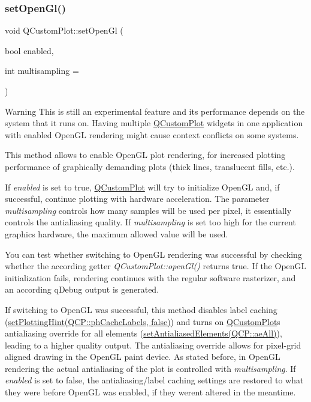 \subsubsection{\texorpdfstring{set\+Open\+Gl()}{setOpenGl()}}
{\footnotesize\ttfamily void Q\+Custom\+Plot\+::set\+Open\+Gl (\begin{DoxyParamCaption}\item[{bool}]{enabled,  }\item[{int}]{multisampling = {} }\end{DoxyParamCaption})}

\begin{DoxyWarning}{Warning}
This is still an experimental feature and its performance depends on the system that it runs on. Having multiple \hyperlink{classQCustomPlot}{Q\+Custom\+Plot} widgets in one application with enabled Open\+GL rendering might cause context conflicts on some systems.
\end{DoxyWarning}
This method allows to enable Open\+GL plot rendering, for increased plotting performance of graphically demanding plots (thick lines, translucent fills, etc.).

If {\itshape enabled} is set to true, \hyperlink{classQCustomPlot}{Q\+Custom\+Plot} will try to initialize Open\+GL and, if successful, continue plotting with hardware acceleration. The parameter {\itshape multisampling} controls how many samples will be used per pixel, it essentially controls the antialiasing quality. If {\itshape multisampling} is set too high for the current graphics hardware, the maximum allowed value will be used.

You can test whether switching to Open\+GL rendering was successful by checking whether the according getter {\itshape Q\+Custom\+Plot\+::open\+Gl()} returns true. If the Open\+GL initialization fails, rendering continues with the regular software rasterizer, and an according q\+Debug output is generated.

If switching to Open\+GL was successful, this method disables label caching (\hyperlink{classQCustomPlot_a3b7c97bb6c16464e9e15190c07abe9a9}{set\+Plotting\+Hint(Q\+CP\+:\+:ph\+Cache\+Labels, false)}) and turns on \hyperlink{classQCustomPlot}{Q\+Custom\+Plot}\textquotesingle{}s antialiasing override for all elements (\hyperlink{classQCustomPlot_af6f91e5eab1be85f67c556e98c3745e8}{set\+Antialiased\+Elements(Q\+CP\+:\+:ae\+All)}), leading to a higher quality output. The antialiasing override allows for pixel-\/grid aligned drawing in the Open\+GL paint device. As stated before, in Open\+GL rendering the actual antialiasing of the plot is controlled with {\itshape multisampling}. If {\itshape enabled} is set to false, the antialiasing/label caching settings are restored to what they were before Open\+GL was enabled, if they weren\textquotesingle{}t altered in the meantime.

